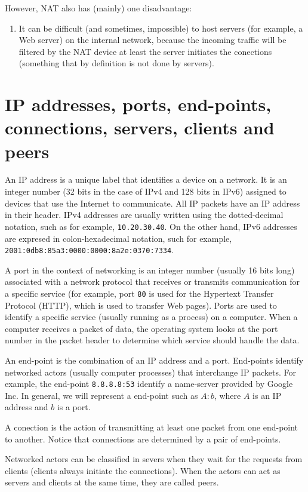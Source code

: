 However, NAT also has (mainly) one disadvantage:
\begin{enumerate}
\item It can be difficult (and sometimes, impossible) to host servers
  (for example, a Web server) on the internal network, because the
  incoming traffic will be filtered by the NAT device at least the
  server initiates the conections (something that by definition is not
  done by servers).
\end{enumerate}

\section{IP addresses, ports, end-points, connections, servers, clients and peers}

An IP address is a unique label that identifies a device on a
network. It is an integer number (32 bits in the case of IPv4 and 128
bits in IPv6) assigned to devices that use the Internet to
communicate. All IP packets have an IP address in their header. IPv4
addresses are usually written using the dotted-decimal notation, such
as for example, \texttt{10.20.30.40}. On the other hand, IPv6
addresses are expresed in colon-hexadecimal notation, such for
example, \texttt{2001:0db8:85a3:0000:0000:8a2e:0370:7334}.

A port in the context of networking is an integer number (usually 16
bits long) associated with a network protocol that receives or
transmits communication for a specific service (for example, port
\texttt{80} is used for the Hypertext Transfer Protocol (HTTP), which
is used to transfer Web pages). Ports are used to identify a specific
service (usually running as a process) on a computer. When a computer
receives a packet of data, the operating system looks at the port
number in the packet header to determine which service should handle
the data.

An end-point is the combination of an IP address and a
port. End-points identify networked actors (usually computer
processes) that interchange IP packets. For example, the end-point
\texttt{8.8.8.8:53} identify a name-server provided by Google Inc. In
general, we will represent a end-point such as $A:b$, where $A$ is an
IP address and $b$ is a port.

A conection is the action of transmitting at least one packet from one
end-point to another. Notice that connections are determined by a pair
of end-points.

Networked actors can be classified in severs when they wait for the
requests from clients (clients always initiate the connections). When
the actors can act as servers and clients at the same time, they are
called peers.

